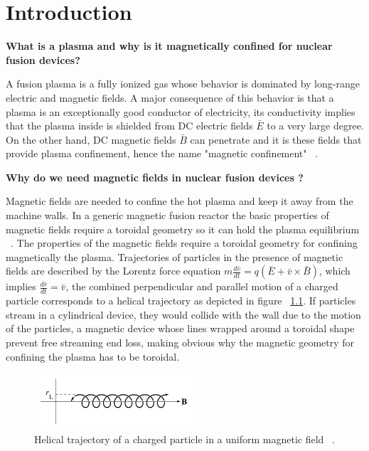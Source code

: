 \chapter{Introduction}

\textbf{What is a plasma and why is it magnetically confined for nuclear fusion devices?}

A fusion plasma is a fully ionized gas whose behavior is dominated by long-range electric and magnetic fields. A major consequence of this behavior is that a plasma is an exceptionally good conductor of electricity, its conductivity implies that the plasma inside is shielded from DC electric fields $\bar{E}$ to a very large degree. On the other hand, DC magnetic fields $\bar{B}$ can penetrate and it is these fields that provide plasma confinement, hence the name "magnetic confinement" ~\cite[Chapter~6]{Freidberg2007}.\smallskip

\textbf{Why do we need magnetic fields in nuclear fusion devices ?}
\smallskip

Magnetic fields are needed to confine the hot plasma and keep it away from the machine walls.  In a generic magnetic fusion reactor the basic properties of magnetic fields require  a toroidal geometry so it can hold the plasma equilibrium ~\cite[Chapter~4]{Freidberg2007}. The properties of the magnetic fields require a toroidal geometry for confining magnetically the plasma. Trajectories of particles in the presence of magnetic fields are described by the Lorentz force equation $m \frac{d\bar{v}}{dt}=q(\bar{E}+\bar{v}\times \bar{B})$, which implies $\frac{d\bar{r}}{dt}=\bar{v}$, the combined perpendicular and parallel motion of a charged particle corresponds to a helical trajectory as  depicted in figure ~\ref{Helical}. If particles stream in a cylindrical device, they would collide with the wall due to the motion of the particles, a magnetic device whose lines wrapped around  a toroidal shape  prevent free streaming end loss, making obvious why the magnetic geometry for confining the plasma has to be toroidal.\smallskip

\begin{figure}
	\centering
	\includegraphics[width=0.525\textwidth]{Chp1/Helical_tray.png}
	\caption{  Helical trajectory of a charged particle in a uniform magnetic field ~\cite[Chapter~8]{Freidberg2007}.\label{Helical}}
\end{figure}

